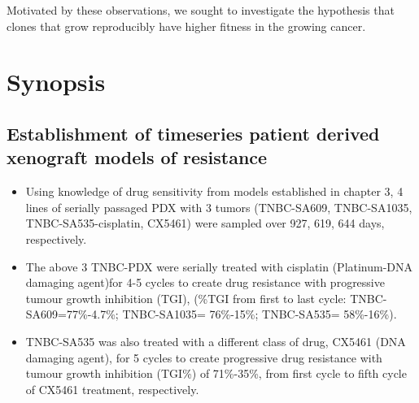Motivated by these observations, we sought to investigate the hypothesis that clones that grow reproducibly have higher fitness in the growing cancer.


\section{Synopsis}

\subsection {Establishment of timeseries patient derived xenograft models of resistance}
\begin{itemize}
\item	Using knowledge of drug sensitivity from models established in chapter 3, 4 lines of serially passaged PDX with 3 tumors (TNBC-SA609, TNBC-SA1035, TNBC-SA535-cisplatin, CX5461) were sampled over 927, 619, 644 days, respectively.

\item	The above 3 TNBC-PDX were serially treated with cisplatin (Platinum-DNA damaging agent)for 4-5 cycles to create drug resistance with progressive tumour growth inhibition (TGI), (\%TGI from first to last cycle: TNBC-SA609=77\%-4.7\%; TNBC-SA1035= 76\%-15\%; TNBC-SA535= 58\%-16\%).

\item  TNBC-SA535 was also treated with a different class of drug, CX5461 (DNA damaging agent), for 5 cycles to create progressive drug resistance with tumour growth inhibition (TGI\%) of 71\%-35\%, from first cycle to fifth cycle of CX5461 treatment, respectively.


\end{itemize}



